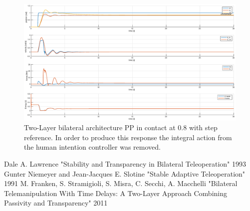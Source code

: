 \documentclass[a4paper,12pt]{article}
\begin{document}
\begin{figure}[H]
    \begin{center}
        \hspace*{-4.5cm}
        \includegraphics[scale=0.5]{images/energy_pp_step.eps}
    \end{center}
    \caption{Two-Layer bilateral architecture PP in contact at 0.8 with step reference. In order to produce this response the integral action from the human intention controller was removed.}
    \label{fig:energy_pp_step}
\end{figure}

\begin{thebibliography}{100}
    \addtolength{\leftmargin}{0.2in}
    \setlength{\itemindent}{-0.2in}

     Dale A. Lawrence "Stability and Transparency in Bilateral Teleoperation" 1993
     Gunter Niemeyer and Jean-Jacques E. Slotine "Stable Adaptive Teleoperation" 1991
     M. Franken, S. Stramigioli, S. Misra, C. Secchi, A. Macchelli "Bilateral Telemanipulation With Time Delays: A Two-Layer Approach Combining Passivity and Transparency" 2011
\end{thebibliography}
\end{document}
